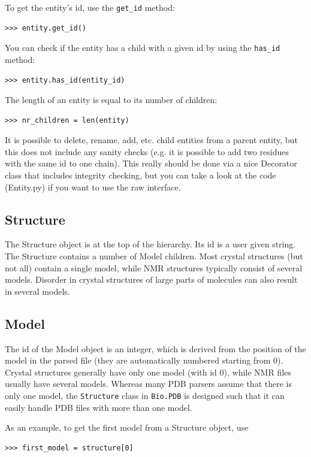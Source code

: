 To get the entity's id, use the \verb+get_id+ method:
\begin{verbatim}
>>> entity.get_id()
\end{verbatim}
You can check if the entity has a child with a given id by using the \verb+has_id+ method:
\begin{verbatim}
>>> entity.has_id(entity_id)
\end{verbatim}
The length of an entity is equal to its number of children:
\begin{verbatim}
>>> nr_children = len(entity)
\end{verbatim}

It is possible to delete, rename, add, etc. child entities from a parent entity,
but this does not include any sanity checks (e.g. it is possible to add two
residues with the same id to one chain). This really should be done via a nice
Decorator class that includes integrity checking, but you can take a look at
the code (Entity.py) if you want to use the raw interface.

\subsection{Structure}

The Structure object is at the top of the hierarchy. Its id is a user given
string. The Structure contains a number of Model children. Most crystal structures
(but not all) contain a single model, while NMR structures typically consist
of several models. Disorder in crystal structures of large parts of molecules
can also result in several models.

\subsection{Model}

The id of the Model object is an integer, which is derived from the position
of the model in the parsed file (they are automatically numbered starting from
0).
Crystal structures generally have only one model (with id 0), while NMR files usually have several models. Whereas many PDB parsers assume that there is only one model, the \verb+Structure+ class in \verb+Bio.PDB+ is designed such that it can easily handle PDB files with more than one model.

As an example, to get the first model from a Structure object, use
\begin{verbatim}
>>> first_model = structure[0]
\end{verbatim}

